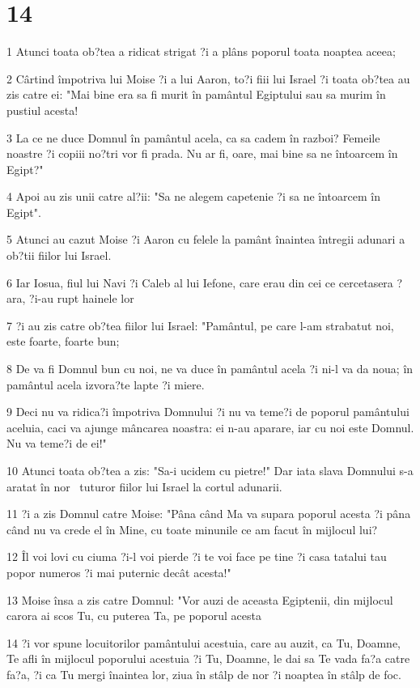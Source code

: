 \chapter{14}

\par 1 Atunci toata ob?tea a ridicat strigat ?i a plâns poporul toata noaptea aceea;
\par 2 Cârtind împotriva lui Moise ?i a lui Aaron, to?i fiii lui Israel ?i toata ob?tea au zis catre ei: "Mai bine era sa fi murit în pamântul Egiptului sau sa murim în pustiul acesta!
\par 3 La ce ne duce Domnul în pamântul acela, ca sa cadem în razboi? Femeile noastre ?i copiii no?tri vor fi prada. Nu ar fi, oare, mai bine sa ne întoarcem în Egipt?"
\par 4 Apoi au zis unii catre al?ii: "Sa ne alegem capetenie ?i sa ne întoarcem în Egipt".
\par 5 Atunci au cazut Moise ?i Aaron cu felele la pamânt înaintea întregii adunari a ob?tii fiilor lui Israel.
\par 6 Iar Iosua, fiul lui Navi ?i Caleb al lui Iefone, care erau din cei ce cercetasera ?ara, ?i-au rupt hainele lor
\par 7 ?i au zis catre ob?tea fiilor lui Israel: "Pamântul, pe care l-am strabatut noi, este foarte, foarte bun;
\par 8 De va fi Domnul bun cu noi, ne va duce în pamântul acela ?i ni-l va da noua; în pamântul acela izvora?te lapte ?i miere.
\par 9 Deci nu va ridica?i împotriva Domnului ?i nu va teme?i de poporul pamântului aceluia, caci va ajunge mâncarea noastra: ei n-au aparare, iar cu noi este Domnul. Nu va teme?i de ei!"
\par 10 Atunci toata ob?tea a zis: "Sa-i ucidem cu pietre!" Dar iata slava Domnului s-a aratat în nor  tuturor fiilor lui Israel la cortul adunarii.
\par 11 ?i a zis Domnul catre Moise: "Pâna când Ma va supara poporul acesta ?i pâna când nu va crede el în Mine, cu toate minunile ce am facut în mijlocul lui?
\par 12 Îl voi lovi cu ciuma ?i-l voi pierde ?i te voi face pe tine ?i casa tatalui tau popor numeros ?i mai puternic decât acesta!"
\par 13 Moise însa a zis catre Domnul: "Vor auzi de aceasta Egiptenii, din mijlocul carora ai scos Tu, cu puterea Ta, pe poporul acesta
\par 14 ?i vor spune locuitorilor pamântului acestuia, care au auzit, ca Tu, Doamne, Te afli în mijlocul poporului acestuia ?i Tu, Doamne, le dai sa Te vada fa?a catre fa?a, ?i ca Tu mergi înaintea lor, ziua în stâlp de nor ?i noaptea în stâlp de foc.
